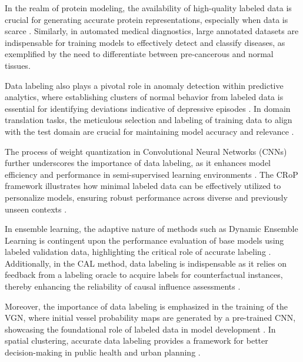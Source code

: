 In the realm of protein modeling, the availability of high-quality labeled data is crucial for generating accurate protein representations, especially when data is scarce \cite{huang2023dataefficientprotein3dgeometric}. Similarly, in automated medical diagnostics, large annotated datasets are indispensable for training models to effectively detect and classify diseases, as exemplified by the need to differentiate between pre-cancerous and normal tissues.

Data labeling also plays a pivotal role in anomaly detection within predictive analytics, where establishing clusters of normal behavior from labeled data is essential for identifying deviations indicative of depressive episodes \cite{jeong2016predictiveanalyticsusingsmartphone}. In domain translation tasks, the meticulous selection and labeling of training data to align with the test domain are crucial for maintaining model accuracy and relevance \cite{bogoychev2020domaintranslationesenoisesynthetic}.

The process of weight quantization in Convolutional Neural Networks (CNNs) further underscores the importance of data labeling, as it enhances model efficiency and performance in semi-supervised learning environments \cite{yin2017quantizationtraininglowbitwidth}. The CRoP framework illustrates how minimal labeled data can be effectively utilized to personalize models, ensuring robust performance across diverse and previously unseen contexts \cite{kaur2024cropcontextwiserobuststatic}.

In ensemble learning, the adaptive nature of methods such as Dynamic Ensemble Learning is contingent upon the performance evaluation of base models using labeled validation data, highlighting the critical role of accurate labeling \cite{pasarkar2024cousinsvendiscorefamily}. Additionally, in the CAL method, data labeling is indispensable as it relies on feedback from a labeling oracle to acquire labels for counterfactual instances, thereby enhancing the reliability of causal influence assessments \cite{sen2018supervisingfeatureinfluence}.

Moreover, the importance of data labeling is emphasized in the training of the VGN, where initial vessel probability maps are generated by a pre-trained CNN, showcasing the foundational role of labeled data in model development \cite{shin2018deepvesselsegmentationlearning}. In spatial clustering, accurate data labeling provides a framework for better decision-making in public health and urban planning \cite{vidanapathirana2022clusterdetectioncapabilitiesaverage}.


